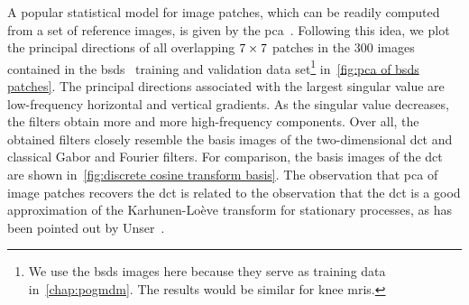 A popular statistical model for image patches, which can be readily computed from a set of reference images, is given by the \gls{pca}~\cite{zoran_learning_2011}.
Following this idea, we plot the principal directions of all overlapping \( \numproduct{7x7} \) patches in the \num{300} images contained in the \gls{bsds}~\cite{martin_database_2001} training and validation data set\footnote{%
	We use the \gls{bsds} images here because they serve as training data in~\cref{chap:pogmdm}.
	The results would be similar for knee \glspl{mri}.
}
in~\cref{fig:pca of bsds patches}.
The principal directions associated with the largest singular value are low-frequency horizontal and vertical gradients.
As the singular value decreases, the filters obtain more and more high-frequency components.
Over all, the obtained filters closely resemble the basis images of the two-dimensional \gls{dct} and classical Gabor and Fourier filters.
For comparison, the basis images of the \gls{dct} are shown in~\cref{fig:discrete cosine transform basis}.
The observation that \gls{pca} of image patches recovers the \gls{dct} is related to the observation that the \gls{dct} is a good approximation of the Karhunen-Loève transform for stationary processes, as has been pointed out by Unser~\cite{unser_approximation_1984}.
